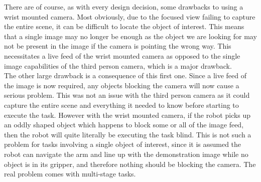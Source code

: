 There are of course, as with every design decision, some drawbacks to using a wrist mounted camera. Most obviously, due to the focused view failing to capture the entire scene, it can be difficult to locate the object of interest. This means that a single image may no longer be enough as the object we are looking for may not be present in the image if the camera is pointing the wrong way. This necessitates a live feed of the wrist mounted camera as opposed to the single image capabilities of the third person camera, which is a major drawback.\\
The other large drawback is a consequence of this first one. Since a live feed of the image is now required, any objects blocking the camera will now cause a serious problem. This was not an issue with the third person camera as it could capture the entire scene and everything it needed to know before starting to execute the task. However with the wrist mounted camera, if the robot picks up an oddly shaped object which happens to block some or all of the image feed, then the robot will quite literally be executing the task blind. This is not such a problem for tasks involving a single object of interest, since it is assumed the robot can navigate the arm and line up with the demonstration image while no object is in its gripper, and therefore nothing should be blocking the camera. The real problem comes with multi-stage tasks.\\

